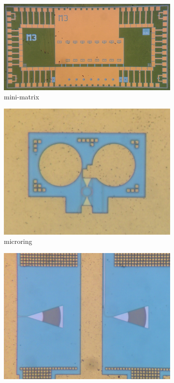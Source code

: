 \begin{figure}[htbp]
	\centering
	\begin{subfigure}[b]{0.7\textwidth}
		\centering
		\includegraphics[draft,width=\textwidth]{photos/minimatrix.png}
		\caption{mini-matrix}
		\label{fig:photo_minimatrix}
	\end{subfigure}
	\begin{subfigure}[t]{0.345\textwidth}
		\centering
		\includegraphics[draft,width=\textwidth]{photos/ring.png}
		\caption{microring}
		\label{fig:photo_ring}
	\end{subfigure}
	\begin{subfigure}[t]{0.345\textwidth}
		\centering
		\includegraphics[draft,width=\textwidth]{photos/grating.png}

\end{subfigure}
\end{figure}
